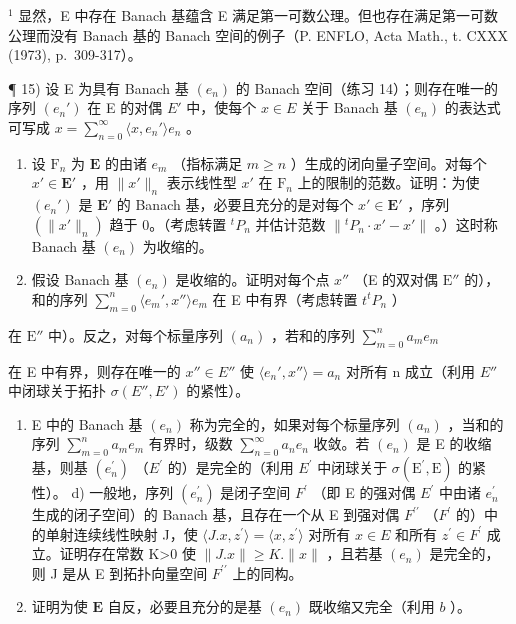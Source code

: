 \(^{1}\) 显然，E 中存在 Banach 基蕴含 E 满足第一可数公理。但也存在满足第一可数公理而没有 Banach 基的 Banach 空间的例子（P. ENFLO, Acta Math., t. CXXX (1973), p.~309-317）。

¶ 15) 设 E 为具有 Banach 基 \((e_n)\) 的 Banach 空间（练习 14）；则存在唯一的序列 \((e_n')\) 在 E 的对偶 \(E'\) 中，使每个 \(x \in E\) 关于 Banach 基 \((e_n)\) 的表达式可写成 \(x = \sum_{n=0}^{\infty} \langle x, e_n' \rangle e_n\) 。

\begin{enumerate}
\def\labelenumi{\alph{enumi})}
\item
  设 \(\mathrm{F}_n\) 为 \(\mathbf{E}\) 的由诸 \(e_m\) （指标满足 \(m \geqslant n\) ）生成的闭向量子空间。对每个 \(x' \in \mathbf{E}'\) ，用 \(\| x' \|_n\) 表示线性型 \(x'\) 在 \(\mathrm{F}_n\) 上的限制的范数。证明：为使 \((e_n')\) 是 \(\mathbf{E}'\) 的 Banach 基，必要且充分的是对每个 \(x' \in \mathbf{E}'\) ，序列 \((\| x' \|_n)\) 趋于 0。（考虑转置 \({}^t P_n\) 并估计范数 \(\| {}^t P_n \cdot x' - x' \|\) 。）这时称 Banach 基 \((e_n)\) 为收缩的。
\item
  假设 Banach 基 \((e_n)\) 是收缩的。证明对每个点 \(x''\) （E 的双对偶 \(\mathrm{E}''\) 的），和的序列 \(\sum_{m=0}^{n} \langle e_m', x'' \rangle e_m\) 在 E 中有界（考虑转置 \(t^t P_n\) ）
\end{enumerate}

在 \(\mathrm{E}''\) 中）。反之，对每个标量序列 \((a_{n})\) ，若和的序列 \(\sum_{m=0}^{n} a_{m} e_{m}\)

在 E 中有界，则存在唯一的 \(x'' \in E''\) 使 \(\langle e_{n}', x'' \rangle = a_{n}\) 对所有 n 成立（利用 \(E''\) 中闭球关于拓扑 \(\sigma(E'', E')\) 的紧性）。

\begin{enumerate}
\def\labelenumi{\alph{enumi})}
\setcounter{enumi}{2}
\item
  E 中的 Banach 基 \((e_n)\) 称为完全的，如果对每个标量序列 \((a_n)\) ，当和的序列 \(\sum_{m=0}^{n} a_m e_m\) 有界时，级数 \(\sum_{n=0}^{\infty} a_n e_n\) 收敛。若 \((e_n)\) 是 E 的收缩基，则基 \((e_{n}^{\prime})\) （\(E^{\prime}\) 的）是完全的（利用 \(E^{\prime}\) 中闭球关于 \(\sigma(\mathrm{E}^{\prime},\mathrm{E})\) 的紧性）。 d) 一般地，序列 \((e_{n}^{\prime})\) 是闭子空间 \(F^{\prime}\) （即 E 的强对偶 \(E^{\prime}\) 中由诸 \(e_{n}^{\prime}\) 生成的闭子空间）的 Banach 基，且存在一个从 E 到强对偶 \(F^{\prime\prime}\) （\(F^{\prime}\) 的）中的单射连续线性映射 J，使 \(\langle J.x,z^{\prime}\rangle=\langle x,z^{\prime}\rangle\) 对所有 \(x\in E\) 和所有 \(z^{\prime}\in F^{\prime}\) 成立。证明存在常数 K\textgreater0 使 \(\|J.x\|\geqslant K.\|x\|\) ，且若基 \((e_{n})\) 是完全的，则 J 是从 E 到拓扑向量空间 \(F^{\prime\prime}\) 上的同构。
\item
  证明为使 \(\mathbf{E}\) 自反，必要且充分的是基 \((e_n)\) 既收缩又完全（利用 \(b\) ）。
\end{enumerate}

